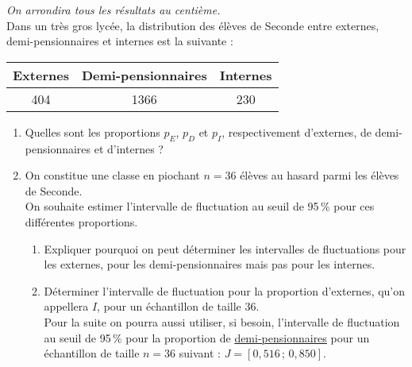 \begin{exo}[12 points]
\emph{On arrondira tous les r\'esultats au centi\`eme.}\\

Dans un tr\`es gros lyc\'ee, la distribution des \'el\`eves de Seconde entre externes, demi-pensionnaires et internes est la suivante :
\begin{center}
 \begin{tabular}{c|c|c}
    Externes & Demi-pensionnaires & Internes \\ \hline
    404 & 1366 & 230
 \end{tabular}
\end{center}
\begin{enumerate}
  \item Quelles sont les proportions $p_E$, $p_D$ et $p_I$, respectivement d'externes, de demi-pensionnaires et d'internes ? 
  \item On constitue une classe en piochant $n=36$ \'el\`eves au hasard parmi les \'el\`eves de Seconde.\\
  On souhaite estimer l'intervalle de fluctuation au seuil de 95\,\% pour ces diff\'erentes proportions.
	\begin{enumerate}
	 \item Expliquer pourquoi on peut d\'eterminer les intervalles de fluctuations pour les externes, pour les demi-pensionnaires mais pas pour les internes.
	 \item \label{q1} D\'eterminer l'intervalle de fluctuation pour la proportion d'externes, qu'on appellera $I$, pour un \'echantillon de taille 36.\\
	 Pour la suite on pourra aussi utiliser, si besoin, l'intervalle de fluctuation au seuil de 95\,\% pour la proportion de \underline{demi-pensionnaires} pour un \'echantillon de taille $n=36$ suivant : $J=[0,516\,;\,0,850]$.
	\end{enumerate}
 

\end{enumerate}
\end{exo}

